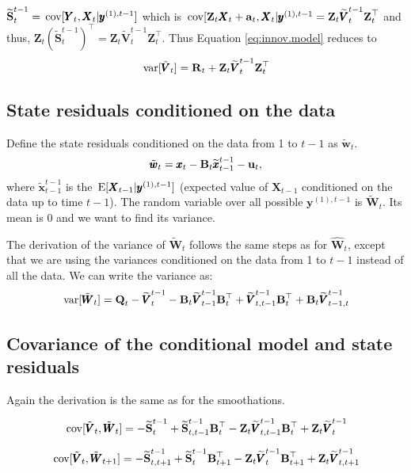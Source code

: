 \documentclass[]{article}
\def\UPS{\mbox{\boldmath $\Upsilon$}}
\def\XI{\mbox{\boldmath $\Xi$}}
\def\BB{\mbox{$\mathbf B$}}	\def\bb{\mbox{$\mathbf b$}} \def\Bb{\mbox{$\mathbf J$}} \def\Ba{\mbox{$\mathbf L$}} \def\Bm{\UPS}
\def\E{\,\textup{\textrm{E}}}
\def\QQ{\mbox{$\mathbf Q$}}	 \def\qq{\mbox{$\mathbf q$}} \def\Qb{\mbox{$\mathbf G$}}  \def\Qm{\mathbb{Q}}
\def\RR{\mbox{$\mathbf R$}}	 \def\rr{\mbox{$\mathbf r$}} \def\Rb{\mbox{$\mathbf H$}}	\def\Rm{\mathbb{R}}
\def\Ss{\mbox{$\mathbf S$}}
\def\VV{\mbox{$\pmb{V}$}}	\def\vv{\mbox{$\pmb{v}$}}
\def\WW{\mbox{$\pmb{W}$}}	\def\ww{\mbox{$\pmb{w}$}}
\def\XX{\mbox{$\pmb{X}$}}	\def\xx{\mbox{$\pmb{x}$}}
\def\YY{\mbox{$\pmb{Y}$}}	\def\yy{\mbox{$\pmb{y}$}}
\def\ZZ{\mbox{$\mathbf Z$}}	\def\zz{\mbox{$\mathbf z$}}	\def\Zb{\mbox{$\mathbf M$}} \def\Za{\mbox{$\mathbf N$}} \def\Zm{\XI}
\def\var{\,\textup{\textrm{var}}}
\def\cov{\,\textup{\textrm{cov}}}
\def\hatxtmt1{\widetilde{\mbox{$\xx$}}_{t-1}^{t-1}}
\def\hatVtt1{\widetilde{\VV}_t^{t-1}}
\def\hatVtmt1{\widetilde{\VV}_{t-1}^{t-1}}
\def\hatVttmt1{\widetilde{\VV}_{t,t-1}^{t-1}}
\def\hatVttpt1{\widetilde{\VV}_{t,t+1}^{t-1}}
\def\hatStt1{\widetilde{\Ss}_t^{t-1}}
\def\hatSttmt1{\widetilde{\Ss}_{t,t-1}^{t-1}}
\def\hatSttpt1{\widetilde{\Ss}_{t,t+1}^{t-1}}
\begin{document}
$\hatStt1=\cov[\YY_t,\XX_t|\yy^{(1), t-1}]$ which is $\cov[\ZZ_t \XX_t + \aa_t,\XX_t|\yy^{(1), t-1} = \ZZ_t \hatVtt1 \ZZ_t^\top$ and thus, $\ZZ_t(\hatStt1)^\top=\ZZ_t \hatVtt1 \ZZ_t^\top$. Thus Equation \ref{eq:innov.model} reduces to
\begin{equation}\label{eq:innov.model2}
\var[\tilde{\VV}_t] = \RR_t + \ZZ_t \hatVtt1 \ZZ_t^\top
\end{equation}

\subsection{State residuals conditioned on the data}

Define the state residuals conditioned on the data from 1 to $t-1$ as $\tilde{\ww}_t$.
\begin{equation}\label{eq:vtT}
\tilde{\ww}_t = \xx_t - \BB_t\hatxtmt1 - \uu_t,
\end{equation}
where $\hatxtmt1$ is the $\E[\XX_{t-1}|\yy^{(1),t-1}]$ (expected value of $\XX_{t-1}$ conditioned on the data up to time $t-1$). The random variable over all possible $\yy^{(1),t-1}$ is $\tilde{\WW}_t$. Its mean is 0 and we want to find its variance.

The derivation of the variance of $\tilde{\WW}_t$ follows the same steps as for $\hat{\WW}_t$, except that we are using the variances conditioned on the data from 1 to $t-1$ instead of all the data.  We can write the variance as:
\begin{equation}
\var[\tilde{\WW}_t]  =  \QQ_t - \hatVtt1 - \BB_t \hatVtmt1 \BB_t^\top + \hatVttmt1 \BB_t^\top + \BB_t\widetilde{\VV}_{t-1,t}^{t-1}
\end{equation}

\subsection{Covariance of the conditional model and state residuals}

Again the derivation is the same as for the smoothations.

\begin{equation}
\cov[\tilde{\VV}_t,\tilde{\WW}_t] = - \hatStt1 + \hatSttmt1\BB_t^\top - \ZZ_t\hatVttmt1\BB_t^\top + \ZZ_t\hatVtt1
\end{equation}

\begin{equation}
\cov[\tilde{\VV}_t,\tilde{\WW}_{t+1}] = - \hatSttpt1 + \hatStt1\BB_{t+1}^\top - \ZZ_t\hatVtt1\BB_{t+1}^\top + \ZZ_t\hatVttpt1
\end{equation}
\end{document}
